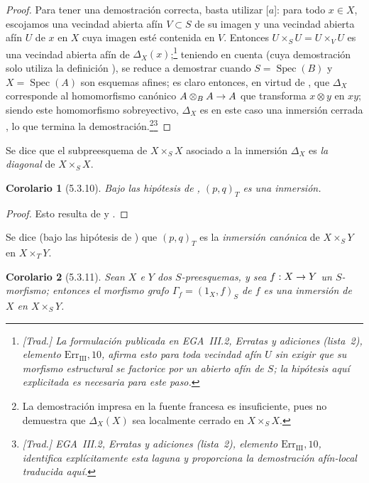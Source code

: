 \documentclass[oneside]{amsart}
\theoremstyle{ega-env-style}
\theoremstyle{ega-thm-env-style}
\newtheorem*{corollary}{Corolario}
\theoremstyle{ega-defn-env-style}
\renewcommand{\to}{\mathchoice{\longrightarrow}{\rightarrow}{\rightarrow}{\rightarrow}}
\let\EGAOriginalLabel\label
\renewcommand{\label}[1]{\phantomsection\EGAOriginalLabel{#1}}
\begin{document}
\begin{proof}
Para tener una demostración correcta, basta utilizar [$a$]: para todo $x\in X$, escojamos una vecindad abierta afín $V\subset S$ de su imagen y una vecindad abierta afín $U$ de $x$ en $X$ cuya imagen esté contenida en $V$. Entonces $U\times_SU=U\times_VU$ es una vecindad abierta afín de $\Delta_X(x)$;\footnote{\emph{[Trad.] La formulación publicada en EGA~III.2, Erratas y adiciones (lista~2), elemento $\mathrm{Err}_{\mathrm{III}},10$, afirma esto para toda vecindad afín $U$ sin exigir que su morfismo estructural se factorice por un abierto afín de $S$; la hipótesis aquí explicitada es necesaria para este paso.}}
teniendo en cuenta  (cuya demostración solo utiliza la definición ), se reduce a demostrar  cuando $S=\operatorname{Spec}(B)$ y $X=\operatorname{Spec}(A)$ son esquemas afines; es claro entonces, en virtud de , que $\Delta_X$ corresponde al homomorfismo canónico $A\otimes_BA\to A$ que transforma $x\otimes y$ en $xy$; siendo este homomorfismo sobreyectivo, $\Delta_X$ es en este caso una inmersión cerrada , lo que termina la demostración.\footnote{La demostración impresa en la fuente francesa es insuficiente, pues no
demuestra que $\Delta_X(X)$ sea localmente cerrado en $X\times_S X$.}\footnote{\emph{[Trad.] EGA~III.2, Erratas y adiciones (lista~2), elemento $\mathrm{Err}_{\mathrm{III}},10$, identifica explícitamente esta laguna y proporciona la demostración afín-local traducida aquí.}}
\end{proof}

Se dice que el subpreesquema de $X\times_S X$ asociado a la inmersión $\Delta_X$  es \emph{la diagonal} de $X\times_S X$.

\begin{corollary}[5.3.10]
\label{I.5.3.10}
Bajo las hipótesis de , $(p,q)_T$ es una inmersión.
\end{corollary}

\begin{proof}
Esto resulta de  y .
\end{proof}

Se dice (bajo las hipótesis de ) que $(p,q)_T$ es la \emph{inmersión canónica} de $X\times_S Y$ en $X\times_T Y$.

\begin{corollary}[5.3.11]
\label{I.5.3.11}
Sean $X$ e $Y$ dos $S$-preesquemas, y sea $f:X\to Y$ un $S$-morfismo;
entonces el morfismo grafo $\Gamma_f=(1_X,f)_S$ de $f$  es una inmersión de $X$ en $X\times_S Y$.
\end{corollary}
\end{document}

